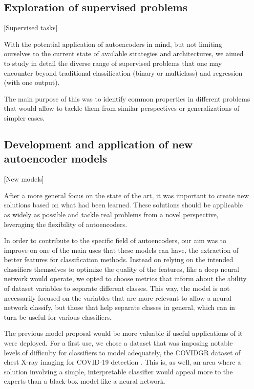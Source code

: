 \subsection{Exploration of supervised problems}[Supervised tasks]\label{ss:exploration}

With the potential application of autoencoders in mind, but not limiting ourselves to the current state of available strategies and architectures, we aimed to study in detail the diverse range of supervised problems that one may encounter beyond traditional classification (binary or multiclass) and regression (with one output).

The main purpose of this was to identify common properties in different problems that would allow to tackle them from similar perspectives or generalizations of simpler cases.

\subsection{Development and application of new autoencoder models}[New models]\label{ss:newae}

After a more general focus on the state of the art, it was important to create new solutions based on what had been learned. These solutions should be applicable as widely as possible and tackle real problems from a novel perspective, leveraging the flexibility of autoencoders.

In order to contribute to the specific field of autoencoders, our aim was to improve on one of the main uses that these models can have, the extraction of better features for classification methods. Instead on relying on the intended classifiers themselves to optimize the quality of the features, like a deep neural network would operate, we opted to choose metrics that inform about the ability of dataset variables to separate different classes. This way, the model is not necessarily focused on the variables that are more relevant to allow a neural network classify, but those that help separate classes in general, which can in turn be useful for various classifiers.

The previous model proposal would be more valuable if useful applications of it were deployed. For a first use, we chose a dataset that was imposing notable levels of difficulty for classifiers to model adequately, the COVIDGR dataset of chest X-ray imaging for COVID-19 detection . This is, as well, an area where a solution involving a simple, interpretable classifier would appeal more to the experts than a black-box model like a neural network.

